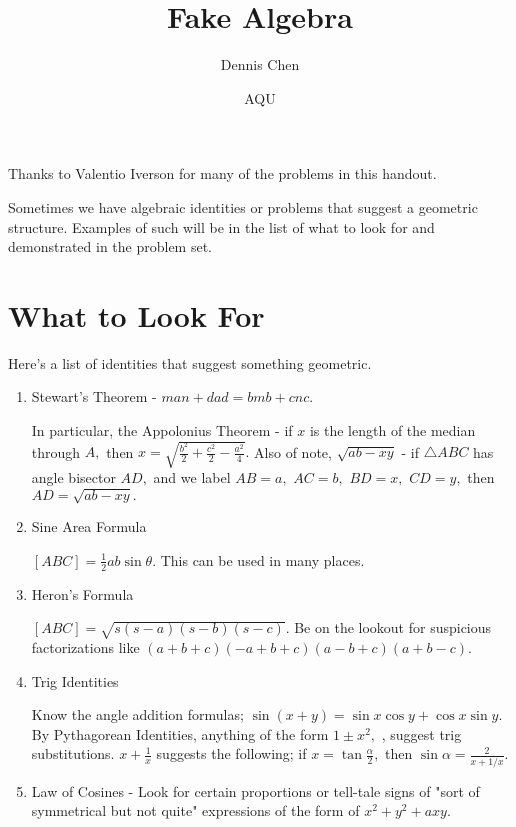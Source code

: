 \documentclass[mast]{lucky}
\title{Fake Algebra}
\author{Dennis Chen}
\date{AQU}
\begin{document}
\maketitle
Thanks to Valentio Iverson for many of the problems in this handout.

Sometimes we have algebraic identities or problems that suggest a geometric structure. Examples of such will be in the list of what to look for and demonstrated in the problem set.

\section{What to Look For}
Here's a list of identities that suggest something geometric.
\begin{enumerate}
    \item Stewart's Theorem - $man+dad=bmb+cnc.$
    \begin{itemize}
    \Item In particular, the Appolonius Theorem - if $x$ is the length of the median through $A,$ then $x=\sqrt{\frac{b^2}{2}+\frac{c^2}{2}-\frac{a^2}{4}}.$
    \Item Also of note, $\sqrt{ab-xy}$ - if $\triangle ABC$ has angle bisector $AD,$ and we label $AB=a,$ $AC=b,$ $BD=x,$ $CD=y,$ then $AD=\sqrt{ab-xy}.$
    \end{itemize}
    \item Sine Area Formula
	\begin{itemize}
	\Item $[ABC]=\frac{1}{2}ab\sin \theta.$ This can be used in many places.
	\end{itemize}
    \item Heron's Formula
    \begin{itemize}
    \Item $[ABC]=\sqrt{s(s-a)(s-b)(s-c)}.$ Be on the lookout for suspicious factorizations like $(a+b+c)(-a+b+c)(a-b+c)(a+b-c).$
    \end{itemize}
    \item Trig Identities
    \begin{itemize}
	\Item Know the angle addition formulas; $\sin(x+y)=\sin x\cos y+\cos x\sin y.$
	\Item By Pythagorean Identities, anything of the form $1\pm x^2,$ , suggest trig substitutions.
    \Item $x+\frac{1}{x}$ suggests the following; if $x=\tan\frac{\alpha}{2},$ then $\sin \alpha = \frac{2}{x+1/x}.$
    \end{itemize}
    \item Law of Cosines - Look for certain proportions or tell-tale signs of "sort of symmetrical but not quite" expressions of the form of $x^2+y^2+axy.$
\end{enumerate}
\end{document}
